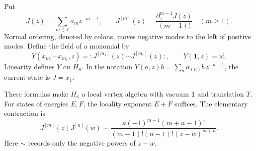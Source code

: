 Put
\[
 J(z)=\sum_{m\in\mathbb Z}a_mz^{-m-1},\qquad
 J^{[m]}(z)=\frac{\partial_z^{m-1}J(z)}{(m-1)!}
 \quad(m\geq1).
\]
Normal ordering, denoted by colons, moves negative modes
to the left of positive modes. Define the field of a
monomial by
\begin{equation}\label{v4-eq:singular-state-field}
 Y(x_{m_1}\cdots x_{m_r},z)
       =:J^{[m_1]}(z)\cdots J^{[m_r]}(z):,
 \qquad Y(\mathbf1,z)=\mathrm{id}.
\end{equation}
Linearity defines \(Y\) on \(H_\kappa\). In the
notation \(Y(a,z)b=\sum_n a_{(n)}b\,z^{-n-1}\),
the current state is \(J=x_1\).

\begin{proposition}\label{v4-prop:singular-heisenberg-fields}
These formulas make \(H_\kappa\) a local vertex algebra
with vacuum \(\mathbf1\) and translation \(T\).
For states of energies \(E,F\), the locality exponent
\(E+F\) suffices. The elementary contraction is
\begin{equation}\label{v4-eq:singular-derivative-contraction}
 J^{[m]}(z)J^{[n]}(w)\sim
 \frac{\kappa(-1)^{m-1}(m+n-1)!}
      {(m-1)!(n-1)!(z-w)^{m+n}}.
\end{equation}
Here \(\sim\) records only the negative powers of
\(z-w\).
\end{proposition}

